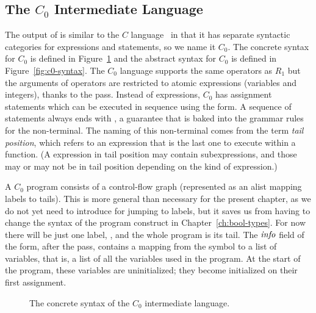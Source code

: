 \documentclass[11pt]{book}
\begin{document}
\subsection{The $C_0$ Intermediate Language}

The output of  is similar to the $C$
language~\citep{Kernighan:1988nx} in that it has separate syntactic
categories for expressions and statements, so we name it $C_0$.  The
concrete syntax for $C_0$ is defined in
Figure~\ref{fig:c0-concrete-syntax} and the abstract syntax for $C_0$
is defined in Figure~\ref{fig:c0-syntax}.
%
The $C_0$ language supports the same operators as $R_1$ but the
arguments of operators are restricted to atomic expressions (variables
and integers), thanks to the  pass. Instead
of  expressions, $C_0$ has assignment statements which can be
executed in sequence using the  form. A sequence of
statements always ends with , a guarantee that is baked
into the grammar rules for the  non-terminal. The naming of
this non-terminal comes from the term \emph{tail position},
which refers to an expression that is the last one to execute within a
function. (A expression in tail position may contain subexpressions,
and those may or may not be in tail position depending on the kind of
expression.)

A $C_0$ program consists of a control-flow graph (represented as an
alist mapping labels to tails). This is more general than
necessary for the present chapter, as we do not yet need to introduce
 for jumping to labels, but it saves us from having to
change the syntax of the program construct in
Chapter~\ref{ch:bool-types}.  For now there will be just one label,
, and the whole program is its tail.
%
The $\mathit{info}$ field of the  form, after the
 pass, contains a mapping from the symbol
 to a list of variables, that is, a list of all the
variables used in the program. At the start of the program, these
variables are uninitialized; they become initialized on their first
assignment.

\begin{figure}[tbp]
\caption{The concrete syntax of the $C_0$ intermediate language.}
\label{fig:c0-concrete-syntax}
\end{figure}
\end{document}
